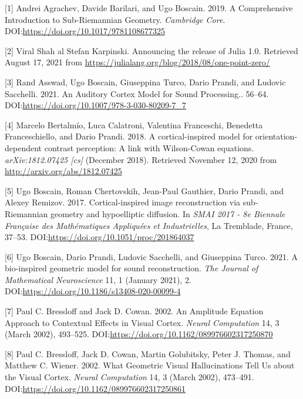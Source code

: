 \documentclass[american,]{article}
\theoremstyle{definition}
\theoremstyle{definition}
\theoremstyle{definition}
\theoremstyle{remark}
\begin{document}
\hypertarget{refs}{}
\leavevmode\hypertarget{ref-subriemannian}{}%
{[}1{]} Andrei Agrachev, Davide Barilari, and Ugo Boscain. 2019. A Comprehensive Introduction to Sub-Riemannian Geometry. \emph{Cambridge Core}. DOI:\url{https://doi.org/10.1017/9781108677325}

\leavevmode\hypertarget{ref-julia2018}{}%
{[}2{]} Viral Shah al Stefan Karpinski. Announcing the release of Julia 1.0. Retrieved August 17, 2021 from \url{https://julialang.org/blog/2018/08/one-point-zero/}

\leavevmode\hypertarget{ref-asswad2021}{}%
{[}3{]} Rand Asswad, Ugo Boscain, Giuseppina Turco, Dario Prandi, and Ludovic Sacchelli. 2021. An Auditory Cortex Model for Sound Processing.. 56--64. DOI:\url{https://doi.org/10.1007/978-3-030-80209-7_7}

\leavevmode\hypertarget{ref-bertalmio2018}{}%
{[}4{]} Marcelo Bertalmío, Luca Calatroni, Valentina Franceschi, Benedetta Franceschiello, and Dario Prandi. 2018. A cortical-inspired model for orientation-dependent contrast perception: A link with Wilson-Cowan equations. \emph{arXiv:1812.07425 {[}cs{]}} (December 2018). Retrieved November 12, 2020 from \url{http://arxiv.org/abs/1812.07425}

\leavevmode\hypertarget{ref-boscain2017}{}%
{[}5{]} Ugo Boscain, Roman Chertovskih, Jean-Paul Gauthier, Dario Prandi, and Alexey Remizov. 2017. Cortical-inspired image reconstruction via sub-Riemannian geometry and hypoelliptic diffusion. In \emph{SMAI 2017 - 8e Biennale Française des Mathématiques Appliquées et Industrielles}, La Tremblade, France, 37--53. DOI:\url{https://doi.org/10.1051/proc/201864037}

\leavevmode\hypertarget{ref-boscain2021}{}%
{[}6{]} Ugo Boscain, Dario Prandi, Ludovic Sacchelli, and Giuseppina Turco. 2021. A bio-inspired geometric model for sound reconstruction. \emph{The Journal of Mathematical Neuroscience} 11, 1 (January 2021), 2. DOI:\url{https://doi.org/10.1186/s13408-020-00099-4}

\leavevmode\hypertarget{ref-bressloff2002}{}%
{[}7{]} Paul C. Bressloff and Jack D. Cowan. 2002. An Amplitude Equation Approach to Contextual Effects in Visual Cortex. \emph{Neural Computation} 14, 3 (March 2002), 493--525. DOI:\url{https://doi.org/10.1162/089976602317250870}

\leavevmode\hypertarget{ref-bressloff2002a}{}%
{[}8{]} Paul C. Bressloff, Jack D. Cowan, Martin Golubitsky, Peter J. Thomas, and Matthew C. Wiener. 2002. What Geometric Visual Hallucinations Tell Us about the Visual Cortex. \emph{Neural Computation} 14, 3 (March 2002), 473--491. DOI:\url{https://doi.org/10.1162/089976602317250861}
\end{document}
